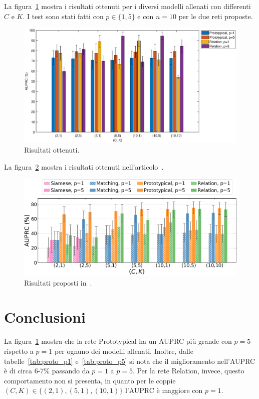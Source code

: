 \documentclass[12pt,a4paper,titlepage]{article}
\begin{document}
La figura~\ref{fig:results} mostra i risultati ottenuti per i diversi modelli allenati con differenti $C$ e $K$. I test sono stati fatti con $p \in \{1, 5\}$ e con $n = 10$ per le due reti proposte. 
\begin{figure}[h]
	\centering	
	\includegraphics[width=1\textwidth]{Immagini/results}
	\caption{Risultati ottenuti.}
	\label{fig:results}
\end{figure}

La figura~\ref{fig:results_paper} mostra i risultati ottenuti nell'articolo~\cite{salamon:Few-Shot}.
\begin{figure}[h]
	\centering	
	\includegraphics[width=1\textwidth]{Immagini/results_paper}
	\caption{Risultati proposti in~\cite{salamon:Few-Shot}.}
	\label{fig:results_paper}
\end{figure}
\clearpage

\section{Conclusioni}
\label{sec:conclusioni}
La figura~\ref{fig:results} mostra che la rete Prototypical ha un AUPRC più grande con $p = 5$ rispetto a $p = 1$ per ognuno dei modelli allenati. Inoltre, dalle tabelle~\ref{tab:proto_p1} e~\ref{tab:proto_p5} si nota che il miglioramento nell'AUPRC è di circa 6-7\% passando da $p = 1$ a $p = 5$. Per la rete Relation, invece, questo comportamento non si presenta, in quanto per le coppie $(C, K) \in \{ (2,1), (5,1), (10,1)\}$ l'AUPRC è maggiore con $p = 1$.
\end{document}

